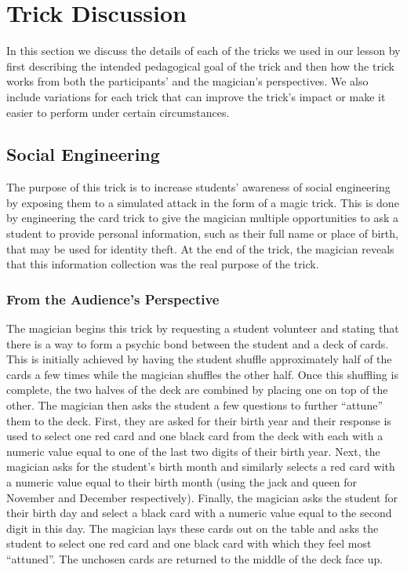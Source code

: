 \section{Trick Discussion}
\label{SEC:background}

In this section we discuss the details of each of the tricks we used in our
lesson by first describing the intended pedagogical goal of the trick and then
how the trick works from both the participants' and the magician's
perspectives.  We also include variations for each trick that can improve the
trick's impact or make it easier to perform under certain circumstances.

\subsection{Social Engineering}

The purpose of this trick is to increase students' awareness of social
engineering by exposing them to a simulated attack in the form of a magic trick.
This is done by engineering the card trick to give the magician multiple
opportunities to ask a student to provide personal information, such as their
full name or place of birth, that may be used for identity theft.
At the end of the trick, the magician reveals that this information collection
was the real purpose of the trick.

\subsubsection{From the Audience's Perspective}

The magician begins this trick by requesting a student volunteer and stating
that there is a way to form a psychic bond between the student and a deck of
cards.  This is initially achieved by having the student shuffle approximately
half of the cards a few times while the magician shuffles the other half.  Once
this shuffling is complete, the two halves of the deck are combined by placing
one on top of the other.
The magician then asks the student
a few questions to further ``attune'' them to the deck.
First, they are asked for their birth year and their response
is used to select one red card and one black card from the deck
with each with a numeric value equal to one of the last two digits of their
birth year.
Next, the magician asks for the student's birth month and similarly selects
a red card with a numeric value equal
to their birth month (using the jack and queen for November and December
respectively).
Finally, the magician asks the student
for their birth day and select a black card with a numeric value
equal to the second digit in this day.
The magician lays these cards out on the table and asks the student to select
one red card and one black card with which they feel most ``attuned''.
The unchosen cards are returned to the middle
of the deck face up.

